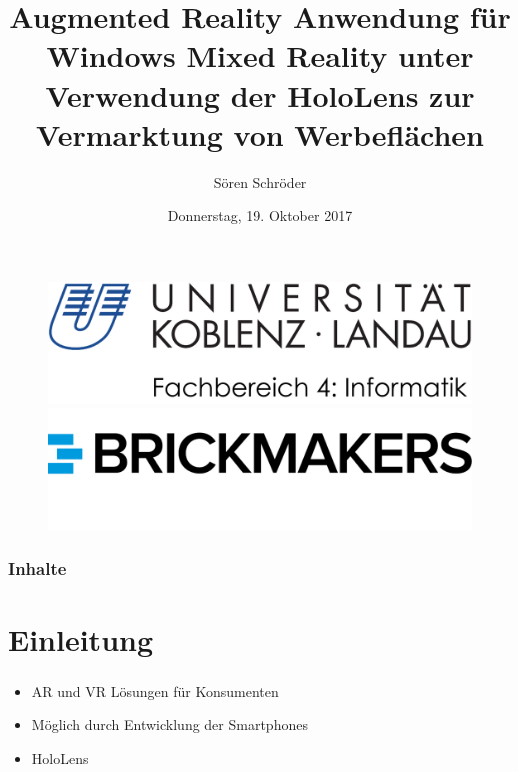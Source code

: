 \documentclass{beamer}
\title[HoloLens Anwendung für Windows Mixed Reality]{Augmented Reality Anwendung für Windows Mixed Reality unter Verwendung der HoloLens zur Vermarktung von Werbeflächen}
\date[2017]{Donnerstag, 19. Oktober 2017}
\author[S. Schröder]{Sören Schröder}
\institute[Uni Koblenz]{Universität Koblenz Landau}
\begin{document}
\begin{frame}[plain]
    \maketitle
    \begin{figure}
        \centering
        \begin{minipage}{.5\textwidth}
            \centering
            \includegraphics[width=.9\linewidth]{logos/UniLogoNeu}
        \end{minipage}%
        \begin{minipage}{.5\textwidth}
            \centering
            \includegraphics[width=.9\linewidth]{logos/brickmakers-logo}
        \end{minipage}
    \end{figure}   
\end{frame}

\begin{frame}
    \frametitle{Inhalte}
    \setcounter{secnumdepth}{2}
\end{frame}

\section{Einleitung}
\begin{frame}
    \frametitle{\insertsection}
    \begin{itemize}[<+->]
        \item AR und VR Lösungen für Konsumenten
        \item Möglich durch Entwicklung der Smartphones
        \item HoloLens
    \end{itemize}

\end{frame}
\end{document}
